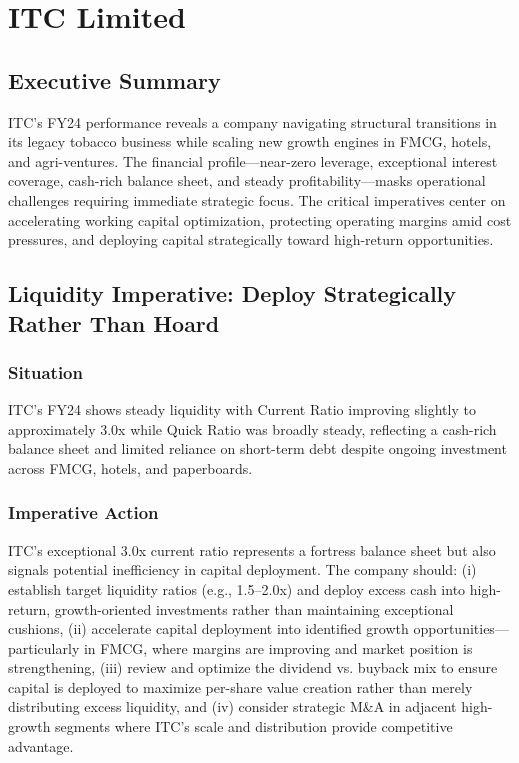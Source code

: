 \documentclass[12pt, a4paper]{report}
\begin{document}
\newpage

\section{ITC Limited}

\subsection{Executive Summary}

ITC's FY24 performance reveals a company navigating structural transitions in its legacy tobacco business while scaling new growth engines in FMCG, hotels, and agri-ventures. The financial profile—near-zero leverage, exceptional interest coverage, cash-rich balance sheet, and steady profitability—masks operational challenges requiring immediate strategic focus. The critical imperatives center on accelerating working capital optimization, protecting operating margins amid cost pressures, and deploying capital strategically toward high-return opportunities.

\subsection{Liquidity Imperative: Deploy Strategically Rather Than Hoard}

\subsubsection{Situation}
ITC's FY24 shows steady liquidity with Current Ratio improving slightly to approximately 3.0x while Quick Ratio was broadly steady, reflecting a cash-rich balance sheet and limited reliance on short-term debt despite ongoing investment across FMCG, hotels, and paperboards.

\subsubsection{Imperative Action}
ITC's exceptional 3.0x current ratio represents a fortress balance sheet but also signals potential inefficiency in capital deployment. The company should: (i) establish target liquidity ratios (e.g., 1.5–2.0x) and deploy excess cash into high-return, growth-oriented investments rather than maintaining exceptional cushions, (ii) accelerate capital deployment into identified growth opportunities—particularly in FMCG, where margins are improving and market position is strengthening, (iii) review and optimize the dividend vs. buyback mix to ensure capital is deployed to maximize per-share value creation rather than merely distributing excess liquidity, and (iv) consider strategic M\&A in adjacent high-growth segments where ITC's scale and distribution provide competitive advantage.
\end{document}

